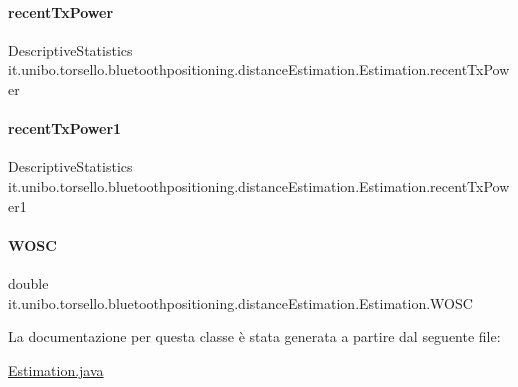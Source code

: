 \paragraph{\texorpdfstring{recent\+Tx\+Power}{recentTxPower}}
{\footnotesize\ttfamily Descriptive\+Statistics it.\+unibo.\+torsello.\+bluetoothpositioning.\+distance\+Estimation.\+Estimation.\+recent\+Tx\+Power\hspace{0.3cm}{\ttfamily [private]}}

\hypertarget{classit_1_1unibo_1_1torsello_1_1bluetoothpositioning_1_1distanceEstimation_1_1Estimation_a1b2b8296a7feaddba403fbdf62b65c04_a1b2b8296a7feaddba403fbdf62b65c04}{}\label{classit_1_1unibo_1_1torsello_1_1bluetoothpositioning_1_1distanceEstimation_1_1Estimation_a1b2b8296a7feaddba403fbdf62b65c04_a1b2b8296a7feaddba403fbdf62b65c04} 
\paragraph{\texorpdfstring{recent\+Tx\+Power1}{recentTxPower1}}
{\footnotesize\ttfamily Descriptive\+Statistics it.\+unibo.\+torsello.\+bluetoothpositioning.\+distance\+Estimation.\+Estimation.\+recent\+Tx\+Power1\hspace{0.3cm}{\ttfamily [private]}}

\hypertarget{classit_1_1unibo_1_1torsello_1_1bluetoothpositioning_1_1distanceEstimation_1_1Estimation_a53237b14bc1d27ae4f751b02d798b595_a53237b14bc1d27ae4f751b02d798b595}{}\label{classit_1_1unibo_1_1torsello_1_1bluetoothpositioning_1_1distanceEstimation_1_1Estimation_a53237b14bc1d27ae4f751b02d798b595_a53237b14bc1d27ae4f751b02d798b595} 
\paragraph{\texorpdfstring{W\+O\+SC}{WOSC}}
{\footnotesize\ttfamily double it.\+unibo.\+torsello.\+bluetoothpositioning.\+distance\+Estimation.\+Estimation.\+W\+O\+SC\hspace{0.3cm}{\ttfamily [private]}}



La documentazione per questa classe è stata generata a partire dal seguente file\+:\begin{DoxyCompactItemize}
\item 
\hyperlink{Estimation_8java}{Estimation.\+java}\end{DoxyCompactItemize}
